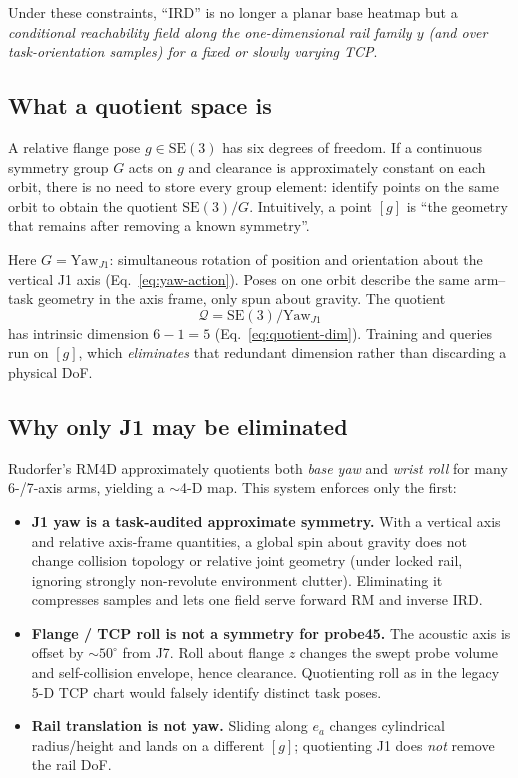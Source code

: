 \documentclass[11pt,a4paper]{article}
\newcommand{\SE}{\mathrm{SE}}
\begin{document}
Under these constraints, ``IRD'' is no longer a planar base heatmap but a
\emph{conditional reachability field along the one-dimensional rail family
\(y\) (and over task-orientation samples) for a fixed or slowly varying TCP}.

\subsection{What a quotient space is}
\label{sec:what-quotient}

A relative flange pose \(g\in\SE(3)\) has six degrees of freedom. If a
continuous symmetry group \(G\) acts on \(g\) and clearance is approximately
constant on each orbit, there is no need to store every group element:
identify points on the same orbit to obtain the quotient \(\SE(3)/G\).
Intuitively, a point \([g]\) is ``the geometry that remains after removing a
known symmetry''.

Here \(G=\mathrm{Yaw}_{J1}\): simultaneous rotation of position and orientation
about the vertical J1 axis (Eq.~\eqref{eq:yaw-action}). Poses on one orbit
describe the same arm--task geometry in the axis frame, only spun about
gravity. The quotient
\[
  \mathcal{Q}=\SE(3)/\mathrm{Yaw}_{J1}
\]
has intrinsic dimension \(6-1=5\) (Eq.~\eqref{eq:quotient-dim}). Training and
queries run on \([g]\), which \emph{eliminates} that redundant dimension rather
than discarding a physical DoF.

\subsection{Why only J1 may be eliminated}
\label{sec:why-only-j1}

Rudorfer's RM4D approximately quotients both \emph{base yaw} and \emph{wrist
roll} for many 6-/7-axis arms, yielding a \(\sim\)4-D map. This system enforces
only the first:

\begin{itemize}[leftmargin=1.4em]
  \item \textbf{J1 yaw is a task-audited approximate symmetry.}
        With a vertical axis and relative axis-frame quantities, a global spin
        about gravity does not change collision topology or relative joint
        geometry (under locked rail, ignoring strongly non-revolute
        environment clutter). Eliminating it compresses samples and lets one
        field serve forward RM and inverse IRD.
  \item \textbf{Flange / TCP roll is not a symmetry for probe45.}
        The acoustic axis is offset by \(\sim 50^{\circ}\) from J7. Roll about
        flange \(z\) changes the swept probe volume and self-collision
        envelope, hence clearance. Quotienting roll as in the legacy 5-D TCP
        chart would falsely identify distinct task poses.
  \item \textbf{Rail translation is not yaw.}
        Sliding along \(e_{a}\) changes cylindrical radius/height and lands on
        a different \([g]\); quotienting J1 does \emph{not} remove the rail DoF.
\end{itemize}
\end{document}
